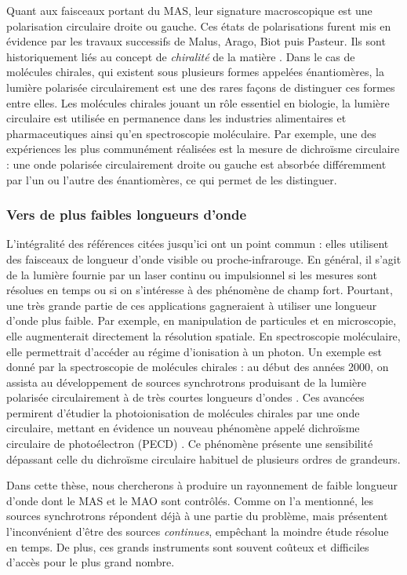 Quant aux faisceaux portant du MAS, leur signature macroscopique est une polarisation circulaire droite ou gauche. Ces états de polarisations furent mis en évidence par les travaux successifs de Malus, Arago, Biot puis Pasteur. Ils sont historiquement liés au concept de \textit{chiralité} de la matière . Dans le cas de molécules chirales, qui existent sous plusieurs formes appelées énantiomères, la lumière polarisée circulairement est une des rares façons de distinguer ces formes entre elles. Les molécules chirales jouant un rôle essentiel en biologie, la lumière circulaire est utilisée en permanence dans les industries alimentaires et pharmaceutiques ainsi qu'en spectroscopie moléculaire. Par exemple, une des expériences les plus communément réalisées est la mesure de dichroïsme circulaire : une onde polarisée circulairement droite ou gauche est absorbée différemment par l'un ou l'autre des énantiomères, ce qui permet de les distinguer.

\subsubsection{Vers de plus faibles longueurs d'onde}
L'intégralité des références citées jusqu'ici ont un point commun : elles utilisent des faisceaux de longueur d'onde visible ou proche-infrarouge. En général, il s'agit de la lumière fournie par un laser continu ou impulsionnel si les mesures sont résolues en temps ou si on s'intéresse à des phénomène de champ fort. Pourtant, une très grande partie de ces applications gagneraient à utiliser une longueur d'onde plus faible. Par exemple, en manipulation de particules et en microscopie, elle augmenterait directement la résolution spatiale. En spectroscopie moléculaire, elle permettrait d'accéder au régime d'ionisation à un photon. Un exemple est donné par la spectroscopie de molécules chirales : au début des années 2000, on assista au développement de sources synchrotrons produisant de la lumière polarisée circulairement à de très courtes longueurs d'ondes . Ces avancées permirent d'étudier la photoionisation de molécules chirales par une onde circulaire, mettant en évidence un nouveau phénomène appelé dichroïsme circulaire de photoélectron (PECD) . Ce phénomène présente une sensibilité dépassant celle du dichroïsme circulaire habituel de plusieurs ordres de grandeurs.

Dans cette thèse, nous chercherons à produire un rayonnement de faible longueur d'onde dont le MAS et le MAO sont contrôlés. Comme on l'a mentionné, les sources synchrotrons répondent déjà à une partie du problème, mais présentent l'inconvénient d'être des sources\textit{ continues}, empêchant la moindre étude résolue en temps. De plus, ces grands instruments sont souvent coûteux et difficiles d'accès pour le plus grand nombre.

